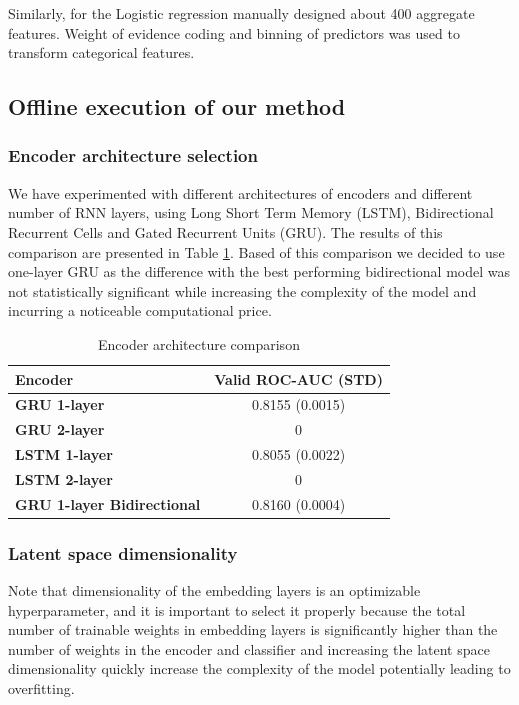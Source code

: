 \documentclass[sigconf]{acmart}
\begin{document}
Similarly, for the Logistic regression manually designed about 400 aggregate features. Weight of evidence coding and binning of predictors \cite{lund2016woe} was used to transform categorical features.

\subsection{Offline execution of our method}

\subsubsection{Encoder architecture selection} \label{sec-arc-sel}

We have experimented with different architectures of encoders and different number of RNN layers, using Long Short Term Memory (LSTM), Bidirectional Recurrent Cells \cite{schuster1997bidirectional} and Gated Recurrent Units (GRU). The results of this comparison are presented in Table \ref{tab-enc-arch}. Based of this comparison we decided to use one-layer GRU as the difference with the best performing bidirectional model was not statistically significant while increasing the complexity of the model and incurring a noticeable computational price.

\begin{table}[ht]
\caption{Encoder architecture comparison}
\begin{tabular}{ | l | c |  }
\hline
\textbf{Encoder} & \textbf{Valid ROC-AUC (STD)} \\
\hline
\textbf{GRU 1-layer} & 0.8155 (0.0015)  \\
\textbf{GRU 2-layer} & 0  \\
\textbf{LSTM 1-layer} & 0.8055 (0.0022) \\
\textbf{LSTM 2-layer} & 0  \\
\textbf{GRU 1-layer Bidirectional} & 0.8160 (0.0004)  \\
\hline
\end{tabular}
\label{tab-enc-arch}
\end{table}


\subsubsection{Latent space dimensionality}

Note that dimensionality of the embedding layers is an optimizable hyperparameter, and it is important to select it properly because  the total number of trainable weights in embedding layers is significantly higher than the number of weights in the encoder and classifier and increasing the latent space dimensionality quickly increase the complexity of the model potentially leading to overfitting.
\end{document}
